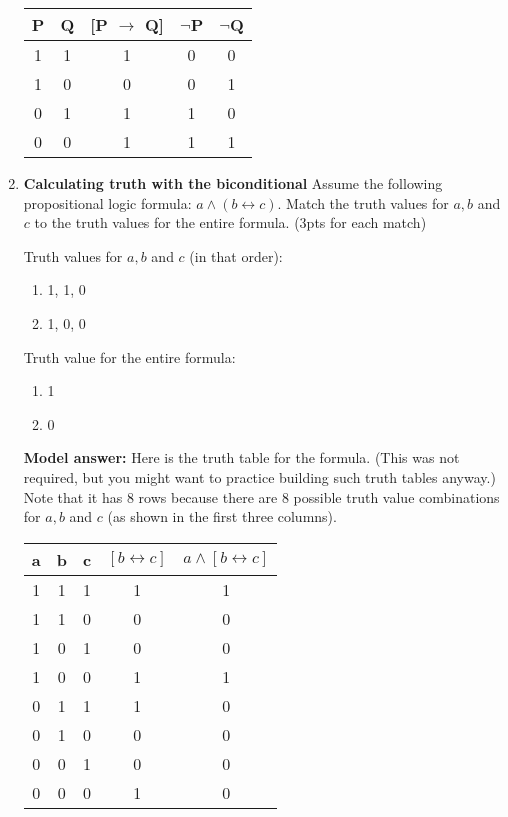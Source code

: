 \documentclass[a4,11pt]{article}
\newcommand{\6}{\mbox{$[\hspace*{-.6mm}[$}}
\newcommand{\9}{\mbox{$]\hspace*{-.6mm}]$}}
\begin{document}
\begin{enumerate}[leftmargin = 12pt]
\begin{tabular}{ccccc}
P & Q & [P $\rightarrow$ Q] & $\neg$P & $\neg$Q \\ \hline
1 & 1 & 1 & 0 & 0 \\ 
1 & 0 & 0 & 0 & 1 \\
0 & 1 & 1 & 1 & 0 \\
0 & 0 & 1 & 1 & 1 \\
\end{tabular}

\item {\bf  Calculating truth with the biconditional} Assume the following propositional logic formula: $a \wedge (b \leftrightarrow c)$. Match the truth values for $a, b$ and $c$ to the truth values for the entire formula. (3pts for each match)

Truth values for $a, b$ and $c$ (in that order):

\begin{enumerate}
\item 1, 1, 0

\item 1, 0, 0

\end{enumerate}

Truth value for the entire formula:

\begin{enumerate}
\item 1

\item 0

\end{enumerate}

{ \bf Model answer:}  Here is the truth table for the formula. (This was not required, but you might want to practice building such truth tables anyway.) Note that it has 8 rows because there are 8 possible truth value combinations for $a, b$ and $c$ (as shown in the first three columns).

\begin{tabular}{ccccc}
a & b & c & $[b \leftrightarrow c]$ & $a \wedge [b \leftrightarrow c]$ \\ \hline
1 & 1 & 1 & 1 &  1 \\ 
1 & 1 & 0 & 0 &  0 \\
1 & 0 & 1 & 0 &  0 \\
1 & 0 & 0 & 1 &  1 \\
0 & 1 & 1 & 1 &  0 \\ 
0 & 1 & 0 & 0 &  0 \\
0 & 0 & 1 & 0 &  0\\
0 & 0 & 0 & 1 &  0\\
\end{tabular}


\end{enumerate}
\end{document}
